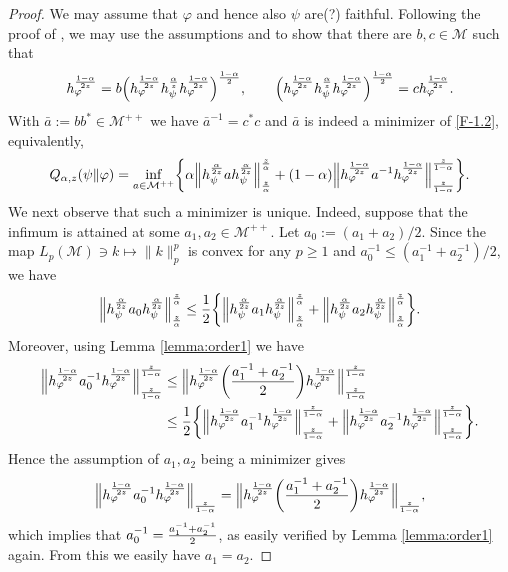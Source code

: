 \documentclass[12pt]{article}
\theoremstyle{definition}
\theoremstyle{remark}
\numberwithin{equation}{section}
\def\cM{\mathcal M}
\def\Me{\mathcal M}
\def\ffi{\varphi}
\begin{document}
\begin{proof} We may assume that $\varphi$ and hence also $\psi$ {\color{red}are(?)} faithful. Following
 the proof of \cite[Theorem 1(vi)]{kato2023onrenyi},  we may use the
assumptions and \cite[Lemma A.58]{hiai2021quantum} to show  that there are $b,c\in\cM$  such that
\begin{align}\label{eq:bc}
h_\ffi^{1-\alpha\over2z}
=b\Bigl(h_\ffi^{1-\alpha\over2z}h_\psi^{\alpha\over z}h_\ffi^{1-\alpha\over2z}\Bigr)^{1-\alpha\over2},\qquad
\Bigl(h_\ffi^{1-\alpha\over2z}h_\psi^{\alpha\over z}h_\ffi^{1-\alpha\over2z}\Bigr)^{1-\alpha\over2}
=ch_\ffi^{1-\alpha\over2z}.
\end{align}
With $\bar a:=bb^*\in\cM^{++}$ we have  $\bar a^{-1}=c^*c$ and $\bar a$ is indeed a minimizer of
\eqref{F-1.2}, equivalently,
\begin{align}\label{eq:infimum}
Q_{\alpha,z}(\psi\|\ffi)
=\inf_{a\in\cM^{++}}\biggl\{\alpha\Big\|h_\psi^{\alpha\over2z}ah_\psi^{\alpha\over2z}\Big\|_{z\over\alpha}^{z\over\alpha}
+(1-\alpha)\Big\|h_\ffi^{1-\alpha\over2z}a^{-1}h_\ffi^{1-\alpha\over2z}\Big\|_{z\over
1-\alpha}^{z\over 1-\alpha}\biggr\}.
\end{align}
We next observe that such a minimizer is unique. Indeed, suppose that the infimum is
attained  at some $a_1,a_2\in \Me^{++}$. Let $a_0:=(a_1+a_2)/2$. Since the map 
$L_{p}(\cM)\ni k\mapsto\|k\|_{p}^{p}$ is convex for any $p\ge 1$ and
$a_0^{-1}\le(a_1^{-1}+a_2^{-1})/2$, we have 
\[
\Big\|h_\psi^{\alpha\over2z}a_0h_\psi^{\alpha\over2z}\Big\|_{z\over\alpha}^{z\over\alpha}
\le{1\over2}\biggl\{\Big\|h_\psi^{\alpha\over2z}a_1
h_\psi^{\alpha\over2z}\Big\|_{z\over\alpha}^{z\over\alpha}
+\Big\|h_\psi^{\alpha\over2z}a_2h_\psi^{\alpha\over2z}\Big\|_{z\over\alpha}^{z\over\alpha}\biggr\}.
\]
Moreover, using Lemma \ref{lemma:order1} we have
\begin{align*}
\Big\|h_\ffi^{1-\alpha\over2z}a_0^{-1}h_\ffi^{1-\alpha\over2z}\Big\|_{z\over1-\alpha}^{z\over1-\alpha}
&\le\Big\|h_\ffi^{1-\alpha\over2z}\biggl({a_1^{-1}+a_2^{-1}\over2}\biggr)
h_\ffi^{1-\alpha\over2z}\Big\|_{z\over1-\alpha}^{z\over1-\alpha} \\
&\le{1\over2}\biggl\{\Big\|h_\ffi^{1-\alpha\over2z}a_1^{-1}
h_\ffi^{1-\alpha\over2z}\Big\|_{z\over1-\alpha}^{z\over1-\alpha}
+\Big\|h_\ffi^{1-\alpha\over2z}a_2^{-1}
h_\ffi^{1-\alpha\over2z}\Big\|_{z\over1-\alpha}^{z\over1-\alpha}\biggr\}.
\end{align*}
Hence the assumption of $a_1,a_2$ being a minimizer gives
\[
\Big\|h_\ffi^{1-\alpha\over2z}a_0^{-1}h_\ffi^{1-\alpha\over2z}\Big\|_{z\over1-\alpha}
=\Big\|h_\ffi^{1-\alpha\over2z}\biggl({a_1^{-1}+a_2^{-1}\over2}\biggr)
h_\ffi^{1-\alpha\over2z}\Big\|_{z\over1-\alpha},
\]
which implies that $a_0^{-1}={a_1^{-1}+a_2^{-1}\over2}$, as easily verified by Lemma \ref{lemma:order1}
again. From this we easily have $a_1=a_2$.


\end{proof}
\end{document}
